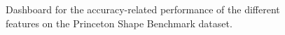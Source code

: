 \begin{figure}[thpb]
   \hfill
  \caption{Dashboard for the accuracy-related performance of the different features on the Princeton Shape Benchmark dataset.}
  \label{fig:PSB_dashboard}
\end{figure}

